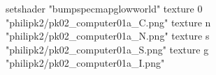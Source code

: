 setshader "bumpspecmapglowworld"
    texture 0 "philipk2/pk02_computer01a_C.png"
    texture n "philipk2/pk02_computer01a_N.png"
    texture s "philipk2/pk02_computer01a_S.png"
    texture g "philipk2/pk02_computer01a_I.png"